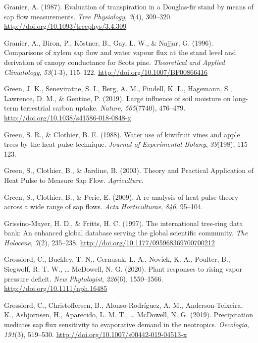 \documentclass[11pt,twoside]{reedthesis}
\begin{document}
\hypertarget{ref-Granier1987}{}
Granier, A. (1987). Evaluation of transpiration in a Douglas-fir stand
by means of sap flow measurements. \emph{Tree Physiology}, \emph{3}(4),
309--320. \url{http://doi.org/10.1093/treephys/3.4.309}

\hypertarget{ref-Granier1996}{}
Granier, A., Biron, P., Köstner, B., Gay, L. W., \& Najjar, G. (1996).
Comparisons of xylem sap flow and water vapour flux at the stand level
and derivation of canopy conductance for Scots pine. \emph{Theoretical
and Applied Climatology}, \emph{53}(1-3), 115--122.
\url{http://doi.org/10.1007/BF00866416}

\hypertarget{ref-green_large_2019}{}
Green, J. K., Seneviratne, S. I., Berg, A. M., Findell, K. L., Hagemann,
S., Lawrence, D. M., \& Gentine, P. (2019). Large influence of soil
moisture on long-term terrestrial carbon uptake. \emph{Nature},
\emph{565}(7740), 476--479.
\url{http://doi.org/10.1038/s41586-018-0848-x}

\hypertarget{ref-Green1988}{}
Green, S. R., \& Clothier, B. E. (1988). Water use of kiwifruit vines
and apple trees by the heat pulse technique. \emph{Journal of
Experimental Botany}, \emph{39}(198), 115--123.

\hypertarget{ref-Green2003}{}
Green, S., Clothier, B., \& Jardine, B. (2003). Theory and Practical
Application of Heat Pulse to Measure Sap Flow. \emph{Agriculture}.

\hypertarget{ref-Green2009}{}
Green, S., Clothier, B., \& Perie, E. (2009). A re-analysis of heat
pulse theory across a wide range of sap flows. \emph{Acta
Horticulturae}, \emph{846}, 95--104.

\hypertarget{ref-Henri1997}{}
Grissino-Mayer, H. D., \& Fritts, H. C. (1997). The international
tree-ring data bank: An enhanced global database serving the global
scientific community. \emph{The Holocene}, \emph{7}(2), 235--238.
\url{http://doi.org/10.1177/095968369700700212}

\hypertarget{ref-grossiord_plant_2020}{}
Grossiord, C., Buckley, T. N., Cernusak, L. A., Novick, K. A., Poulter,
B., Siegwolf, R. T. W., \ldots{} McDowell, N. G. (2020). Plant responses
to rising vapor pressure deficit. \emph{New Phytologist}, \emph{226}(6),
1550--1566. \url{http://doi.org/10.1111/nph.16485}

\hypertarget{ref-grossiord2019}{}
Grossiord, C., Christoffersen, B., Alonso-Rodríguez, A. M.,
Anderson-Teixeira, K., Asbjornsen, H., Aparecido, L. M. T., \ldots{}
McDowell, N. G. (2019). Precipitation mediates sap flux sensitivity to
evaporative demand in the neotropics. \emph{Oecologia}, \emph{191}(3),
519--530. \url{http://doi.org/10.1007/s00442-019-04513-x}
\end{document}
